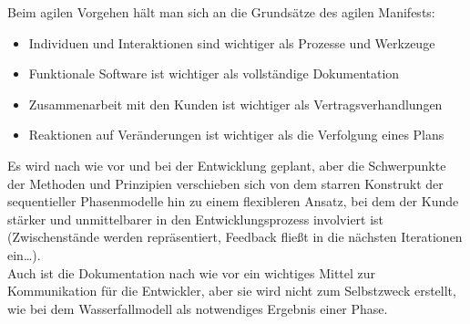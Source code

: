 Beim agilen Vorgehen hält man sich an die Grundsätze des agilen Manifests:

\begin{itemize}
    \item Individuen und Interaktionen sind wichtiger als Prozesse und Werkzeuge
    \item Funktionale Software ist wichtiger als vollständige Dokumentation
    \item Zusammenarbeit mit den Kunden ist wichtiger als Vertragsverhandlungen
    \item Reaktionen auf Veränderungen ist wichtiger als die Verfolgung eines Plans
\end{itemize}

\noindent
Es wird nach wie vor und bei der Entwicklung geplant, aber die Schwerpunkte der Methoden und Prinzipien verschieben sich von dem starren Konstrukt der sequentieller Phasenmodelle hin zu einem flexibleren Ansatz, bei dem der Kunde stärker und unmittelbarer in den Entwicklungsprozess involviert ist (Zwischenstände werden repräsentiert, Feedback fließt in die nächsten Iterationen ein\ldots).\\
Auch ist die Dokumentation nach wie vor ein wichtiges Mittel zur Kommunikation für die Entwickler, aber sie wird nicht zum Selbstzweck erstellt, wie bei dem Wasserfallmodell als notwendiges Ergebnis einer Phase.